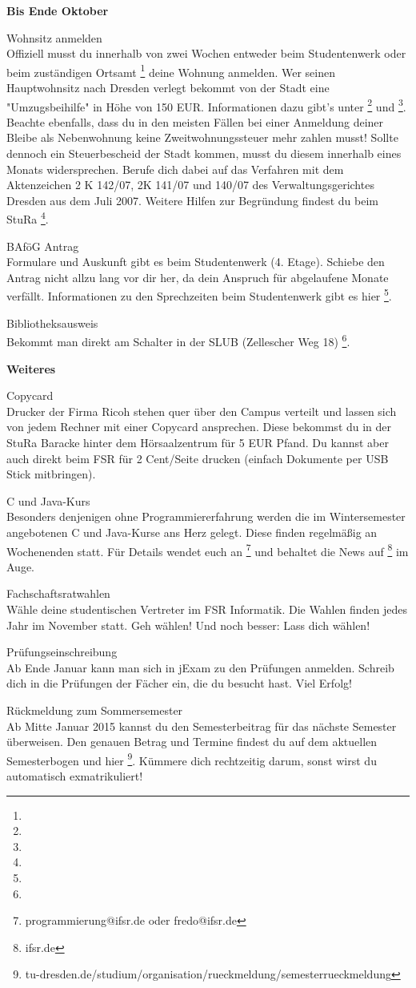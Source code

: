 \textbf{Bis Ende Oktober}

Wohnsitz anmelden \\
Offiziell musst du innerhalb von zwei Wochen entweder beim Studentenwerk oder beim zuständigen Ortsamt \footnote{} deine Wohnung anmelden.
Wer seinen Hauptwohnsitz nach Dresden verlegt bekommt von der Stadt eine "Umzugsbeihilfe" in Höhe von 150 EUR.
Informationen dazu gibt's unter \footnote{} und \footnote{}.
Beachte ebenfalls, dass du in den meisten Fällen bei einer Anmeldung deiner Bleibe als Nebenwohnung keine Zweitwohnungssteuer mehr zahlen musst!
Sollte dennoch ein Steuerbescheid der Stadt kommen, musst du diesem innerhalb eines Monats widersprechen.
Berufe dich dabei auf das Verfahren mit dem Aktenzeichen 2 K 142/07, 2K 141/07 und 140/07 des Verwaltungsgerichtes Dresden aus dem Juli 2007.
Weitere Hilfen zur Begründung findest du beim StuRa \footnote{}.

BAföG Antrag \\
Formulare und Auskunft gibt es beim Studentenwerk (4. Etage).
Schiebe den Antrag nicht allzu lang vor dir her, da dein Anspruch für abgelaufene Monate verfällt.
Informationen zu den Sprechzeiten beim Studentenwerk gibt es hier \footnote{}.

Bibliotheksausweis \\
Bekommt man direkt am Schalter in der SLUB (Zellescher Weg 18) \footnote{}.

\textbf{Weiteres}

Copycard \\
Drucker der Firma Ricoh stehen quer über den Campus verteilt und lassen sich von jedem Rechner mit einer Copycard ansprechen.
Diese bekommst du in der StuRa Baracke hinter dem Hörsaalzentrum für 5 EUR Pfand. Du kannst aber auch direkt beim FSR für 2 Cent/Seite drucken (einfach Dokumente per USB Stick mitbringen).

C und Java-Kurs \\
Besonders denjenigen ohne Programmiererfahrung werden die im Wintersemester angebotenen C und Java-Kurse ans Herz gelegt.
Diese finden regelmäßig an Wochenenden statt.
Für Details wendet euch an \footnote{programmierung@ifsr.de oder fredo@ifsr.de} und behaltet die News auf \footnote{ifsr.de} im Auge.

Fachschaftsratwahlen \\
Wähle deine studentischen Vertreter im FSR Informatik.
Die Wahlen finden jedes Jahr im November statt.
Geh wählen!
Und noch besser: Lass dich wählen!

Prüfungseinschreibung \\
Ab Ende Januar kann man sich in jExam zu den Prüfungen anmelden.
Schreib dich in die Prüfungen der Fächer ein, die du besucht hast.
Viel Erfolg!

Rückmeldung zum Sommersemester \\
Ab Mitte Januar 2015 kannst du den Semesterbeitrag für das nächste Semester überweisen.
Den genauen Betrag und Termine findest du auf dem aktuellen Semesterbogen und hier \footnote{tu-dresden.de/studium/organisation/rueckmeldung/semesterrueckmeldung}.
Kümmere dich rechtzeitig darum, sonst wirst du automatisch exmatrikuliert!
